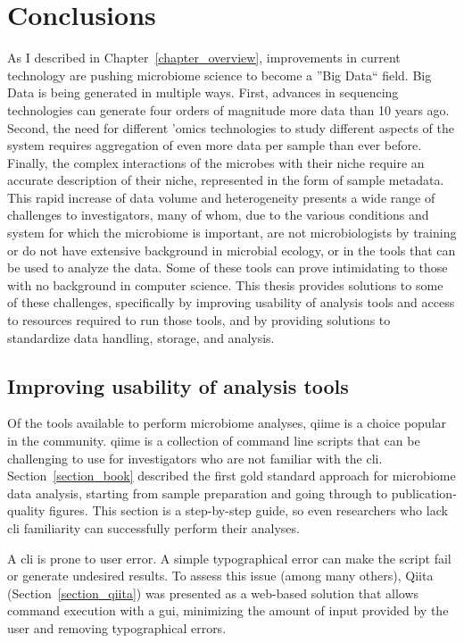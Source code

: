 \chapter{Conclusions}\label{chapter_conclusions}
\glsresetall

As I described in Chapter~\ref{chapter_overview}, improvements in current technology
are pushing microbiome science to become a ''Big Data`` field. Big Data is being
generated in multiple ways. First, advances in sequencing technologies can
generate four orders of magnitude more data than 10 years ago. Second, the need
for different 'omics technologies to study different aspects of the system requires
aggregation of even more data per sample than ever before. Finally, the complex
interactions of the microbes with their niche require an accurate description of
their niche, represented in the form of sample metadata. This rapid increase of
data volume and heterogeneity presents a wide range of challenges to investigators, many of whom, due to
the various conditions and system for which the microbiome is important, are not
microbiologists by training or do not have extensive background in microbial
ecology, or in the tools that can be used to analyze the data. Some of these tools
can prove intimidating to those with no background in computer science. This
thesis provides solutions to some of these challenges, specifically by improving
usability of analysis tools and access to resources required to run those tools,
and by providing solutions to standardize data handling, storage, and analysis.

\section{Improving usability of analysis tools}

Of the tools available to perform microbiome analyses, \gls{qiime} is a choice
popular in the community. \gls{qiime} is a collection of command line scripts that
can be challenging to use for investigators who are not familiar with the \gls{cli}.
Section~\ref{section_book} described the first gold standard approach for microbiome data
analysis, starting from sample preparation and going through to publication-quality
figures. This section is a step-by-step guide, so even researchers who lack \gls{cli}
familiarity can successfully perform their analyses.

A \gls{cli} is prone to user error. A simple typographical error can make the script fail or
generate undesired results. To assess this issue (among many others), Qiita
(Section~\ref{section_qiita}) was presented as a web-based solution that allows
command execution with a \gls{gui}, minimizing the amount of input provided by
the user and removing typographical errors.

